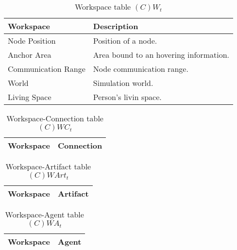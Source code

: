 \begin{table}[H]
	\centering
	\begin{tabular}{|p{4cm}|p{8cm}|}
			\hline
			\textbf{Workspace} & \textbf{Description} \\
			\hline
			Node Position  & Position of a node. \\
			\hline
			Anchor Area  & Area bound to an hovering information. \\
			\hline
			Communication Range  & Node communication range. \\
			\hline
			World  & Simulation world. \\
			\hline
			Living  Space & Person's livin space.\\
			\hline
		\end{tabular}
	\caption{Workspace table $(C)W_t$}
	\label{tab:cwt}
\end{table}

\begin{table}[H]
	\centering
	\begin{tabular}{|p{4cm}|p{8cm}|}
			\hline
			\textbf{Workspace} & \textbf{Connection} \\
			\hline
			\hline
		\end{tabular}
	\caption{Workspace-Connection table $(C)WC_t$}
	\label{tab:cwct}
\end{table}

\begin{table}[H]
	\centering
	\begin{tabular}{|p{4cm}|p{8cm}|}
			\hline
			\textbf{Workspace} & \textbf{Artifact} \\
			\hline
			\hline
		\end{tabular}
	\caption{Workspace-Artifact table $(C)WArt_t$}
	\label{tab:cwartt}
\end{table}

\begin{table}[H]
	\centering
	\begin{tabular}{|p{4cm}|p{8cm}|}
			\hline
			\textbf{Workspace} & \textbf{Agent} \\
			\hline
			\hline
		\end{tabular}
	\caption{Workspace-Agent table $(C)WA_t$}
	\label{tab:cwat}
\end{table}
